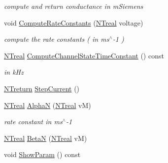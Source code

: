 \begin{DoxyCompactItemize}
\begin{DoxyCompactList}\small\item\em compute and return conductance in mSiemens \item\end{DoxyCompactList}\item 
void \hyperlink{class_n_t_b_p__hranvier__potassium__multi__current__o_a64038301f4559798e5c4b1db0fc3fa36}{ComputeRateConstants} (\hyperlink{nt__types_8h_a814a97893e9deb1eedcc7604529ba80d}{NTreal} voltage)
\begin{DoxyCompactList}\small\item\em compute the rate constants ( in ms$^\wedge$-\/1 ) \item\end{DoxyCompactList}\item 
\hyperlink{nt__types_8h_a814a97893e9deb1eedcc7604529ba80d}{NTreal} \hyperlink{class_n_t_b_p__hranvier__potassium__multi__current__o_a3f5872d5fd24caadedde663f9ca96488}{ComputeChannelStateTimeConstant} () const 
\begin{DoxyCompactList}\small\item\em in kHz \item\end{DoxyCompactList}\item 
\hyperlink{nt__types_8h_ab9564ee8f091e809d21b8451c6683c53}{NTreturn} \hyperlink{class_n_t_b_p__hranvier__potassium__multi__current__o_aa69d52e76b3cf072c787e6ff575c2197}{StepCurrent} ()
\item 
\hyperlink{nt__types_8h_a814a97893e9deb1eedcc7604529ba80d}{NTreal} \hyperlink{class_n_t_b_p__hranvier__potassium__multi__current__o_a8c0c26699b2df0b334ead32771c93f5a}{AlphaN} (\hyperlink{nt__types_8h_a814a97893e9deb1eedcc7604529ba80d}{NTreal} vM)
\begin{DoxyCompactList}\small\item\em rate constant in ms$^\wedge$-\/1 \item\end{DoxyCompactList}\item 
\hyperlink{nt__types_8h_a814a97893e9deb1eedcc7604529ba80d}{NTreal} \hyperlink{class_n_t_b_p__hranvier__potassium__multi__current__o_abd4cf47c91225e86ec685a0910203920}{BetaN} (\hyperlink{nt__types_8h_a814a97893e9deb1eedcc7604529ba80d}{NTreal} vM)
\item 
void \hyperlink{class_n_t_b_p__hranvier__potassium__multi__current__o_a24db02b51f9470a0d00854b1dbf69227}{ShowParam} () const 
\end{DoxyCompactItemize}


